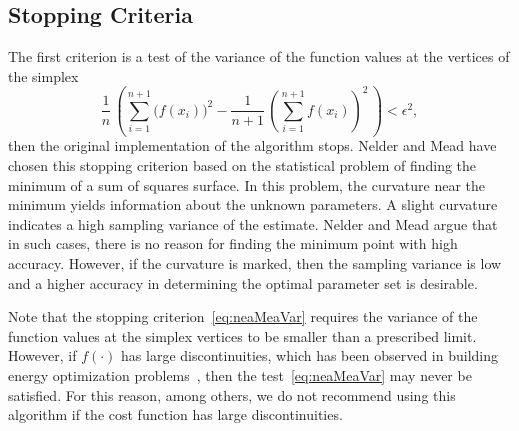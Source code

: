 \subsection{Stopping Criteria}
The first criterion is a test of the variance of the function values at the vertices of the simplex
\begin{equation}
\frac{1}{n} \, \left(
\sum_{i=1}^{n+1} \bigl( f(x_i) \bigr)^2 -
   \frac{1}{n+1} \, \left(\sum_{i=1}^{n+1} f(x_i)    \right)^2 \, 
\right) < \epsilon^2,
 \label{eq:neaMeaVar}
\end{equation}
then the original implementation of the algorithm stops.
Nelder and Mead have chosen this stopping criterion based on the statistical problem
of finding the minimum of a sum of squares surface.
In this problem, the curvature near the minimum yields information about
the unknown parameters.
A slight curvature indicates a high sampling variance of the estimate.
Nelder and Mead argue that in such cases, there is no reason for finding 
the minimum point with high accuracy.
However, if the curvature is marked, 
then the sampling variance is low and a higher accuracy in determining the optimal parameter set is desirable.

Note that the stopping criterion~\eqref{eq:neaMeaVar} requires the variance
of the function values at the simplex vertices to be smaller 
than a prescribed limit.
However, if $f(\cdot)$ has large discontinuities, which has been observed
in building energy optimization problems~\cite{WetterWright2003:1},
then the test~\eqref{eq:neaMeaVar} may never be satisfied.
For this reason, among others, 
we do not recommend using this algorithm if the cost function
has large discontinuities.

\pagebreak[4]
